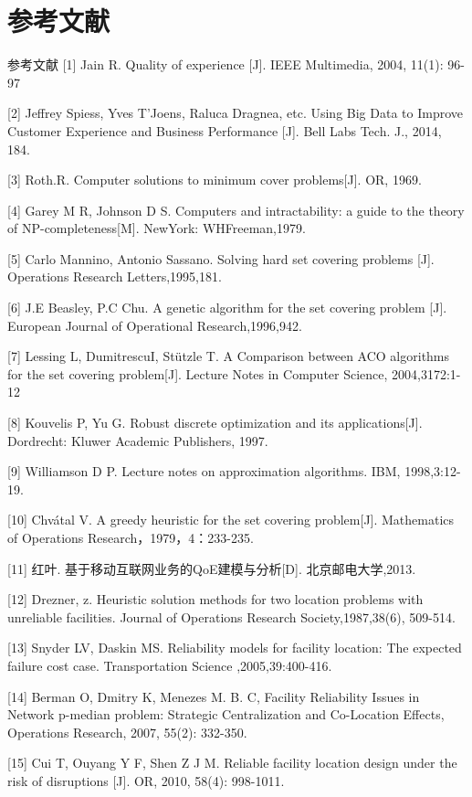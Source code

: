 \documentclass[10pt]{beamer}
\begin{document}
\section{参考文献}\scriptsize
\begin{frame}[allowframebreaks]{参考文献}
[1] Jain R. Quality of experience [J]. IEEE Multimedia, 2004, 11(1): 96-97

[2] Jeffrey Spiess, Yves T’Joens, Raluca Dragnea, etc. Using Big Data to Improve Customer Experience and Business Performance [J]. Bell Labs Tech. J., 2014, 184.

[3] Roth.R. Computer solutions to minimum cover problems[J]. OR, 1969.

[4] Garey M R, Johnson D S. Computers and intractability: a guide to the theory of NP-completeness[M]. NewYork: WHFreeman,1979.


[5] Carlo Mannino, Antonio Sassano. Solving hard set covering problems [J]. Operations Research Letters,1995,181.

[6] J.E Beasley, P.C Chu. A genetic algorithm for the set covering problem [J]. European Journal of Operational Research,1996,942.

[7] Lessing L, DumitrescuI, Stützle T. A Comparison between ACO algorithms for the set covering problem[J]. Lecture Notes in Computer Science, 2004,3172:1-12

[8] Kouvelis P, Yu G. Robust discrete optimization and its applications[J]. Dordrecht: Kluwer Academic Publishers, 1997.

[9] Williamson D P. Lecture notes on approximation algorithms. IBM, 1998,3:12-19.

[10] Chvátal V. A greedy heuristic for the set covering problem[J]. Mathematics of Operations Research，1979，4：233-235.

[11] 红叶. 基于移动互联网业务的QoE建模与分析[D]. 北京邮电大学,2013.

[12] Drezner, z. Heuristic solution methods for two location problems with unreliable facilities. Journal of Operations Research Society,1987,38(6), 509-514.

[13] Snyder LV, Daskin MS. Reliability models for facility location: The expected failure cost case. Transportation Science ,2005,39:400-416.

[14] Berman O, Dmitry K, Menezes M. B. C, Facility Reliability Issues in Network p-median problem: Strategic Centralization and Co-Location Effects, Operations Research, 2007, 55(2): 332-350.

[15] Cui T, Ouyang Y F, Shen Z J M. Reliable facility location design under the risk of disruptions [J]. OR, 2010, 58(4): 998-1011.


\end{frame}
\end{document}
